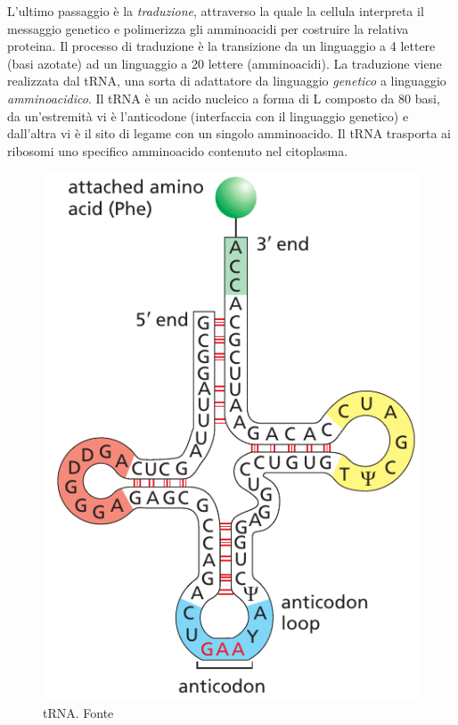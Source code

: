 \par L'ultimo passaggio è la \textit{traduzione}, attraverso la quale la cellula interpreta il messaggio genetico e polimerizza gli amminoacidi per costruire la relativa proteina. Il processo di traduzione è la transizione da un linguaggio a 4 lettere (basi azotate) ad un linguaggio a 20 lettere (amminoacidi). La traduzione viene realizzata dal tRNA, una sorta di adattatore da linguaggio \textit{genetico }a linguaggio \textit{amminoacidico}. Il tRNA è un acido nucleico a forma di L composto da 80 basi, da un'estremità vi è l'anticodone (interfaccia con il linguaggio genetico) e dall'altra vi è il sito di legame con un singolo amminoacido. Il tRNA trasporta ai ribosomi uno specifico amminoacido contenuto nel citoplasma.

\begin{figure}[!htb]
	\centering
	\includegraphics[scale=0.32]{images/tRNA.png}
	\caption{tRNA. Fonte \cite{alberts2018essential}}
	\label{fig:tRNA}
	\endminipage\hfill
	\centering

\end{figure}
